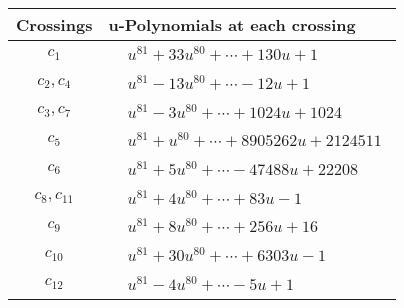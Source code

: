 \documentclass[1p]{elsarticle_modified}
\theoremstyle{definition}
\begin{document}
\begin{tabular}{m{50pt}|m{274pt}}
Crossings & \hspace{64pt}u-Polynomials at each crossing \\
\hline $$\begin{aligned}c_{1}\end{aligned}$$&$\begin{aligned}
&u^{81}+33 u^{80}+\cdots+130 u+1
\end{aligned}$\\
\hline $$\begin{aligned}c_{2},c_{4}\end{aligned}$$&$\begin{aligned}
&u^{81}-13 u^{80}+\cdots-12 u+1
\end{aligned}$\\
\hline $$\begin{aligned}c_{3},c_{7}\end{aligned}$$&$\begin{aligned}
&u^{81}-3 u^{80}+\cdots+1024 u+1024
\end{aligned}$\\
\hline $$\begin{aligned}c_{5}\end{aligned}$$&$\begin{aligned}
&u^{81}+u^{80}+\cdots+8905262 u+2124511
\end{aligned}$\\
\hline $$\begin{aligned}c_{6}\end{aligned}$$&$\begin{aligned}
&u^{81}+5 u^{80}+\cdots-47488 u+22208
\end{aligned}$\\
\hline $$\begin{aligned}c_{8},c_{11}\end{aligned}$$&$\begin{aligned}
&u^{81}+4 u^{80}+\cdots+83 u-1
\end{aligned}$\\
\hline $$\begin{aligned}c_{9}\end{aligned}$$&$\begin{aligned}
&u^{81}+8 u^{80}+\cdots+256 u+16
\end{aligned}$\\
\hline $$\begin{aligned}c_{10}\end{aligned}$$&$\begin{aligned}
&u^{81}+30 u^{80}+\cdots+6303 u-1
\end{aligned}$\\
\hline $$\begin{aligned}c_{12}\end{aligned}$$&$\begin{aligned}
&u^{81}-4 u^{80}+\cdots-5 u+1
\end{aligned}$\\
\hline
\end{tabular}\\~\\
\end{document}

